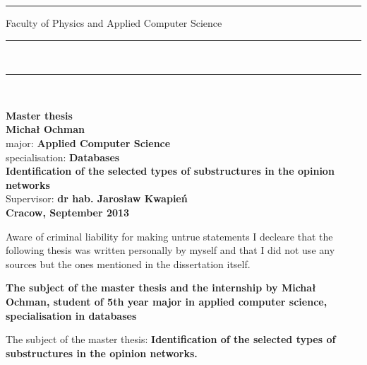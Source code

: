 \rule{26.75mm}{0pt}{
{\large \textsf{Faculty of Physics and Applied Computer Science}}\\
\rule{\textwidth}{3pt}\\
\rule[2ex]
{\textwidth}{1pt}\\
\vspace{7ex}
\begin{center}
{\LARGE \bf \textsf{Master thesis}}\\
\vspace{13ex}
{\bf \Large \textsf{Michał Ochman}}\\
\vspace{3ex}
{\small \sf major: {\bf \textsf{Applied Computer Science}}}\\
\vspace{1.5ex}
{\small \sf specialisation: {\bf \textsf{Databases}}}\\
\vspace{10ex}
{\bf \huge \textsf{Identification of the selected types of substructures in the opinion networks}}\\
\vspace{14ex}
{\Large \sf Supervisor: {\bf \textsf{dr hab. Jarosław Kwapień}}}\\
\vspace{22ex}
{\large \bf \textsf{Cracow, September 2013}}
\end{center}

\newpage

Aware of criminal liability for making untrue statements I decleare that
the following thesis was written personally by myself and that I did not use
any sources but the ones mentioned in the dissertation itself.

\newpage

\begin{center}
{\bf The subject of the master thesis and the internship by Michał Ochman,
student of 5th year major in applied computer science, specialisation in databases}\\
\end{center}

The subject of the master thesis:
{\bf Identification of the selected types of substructures in the opinion networks.}\\

}
